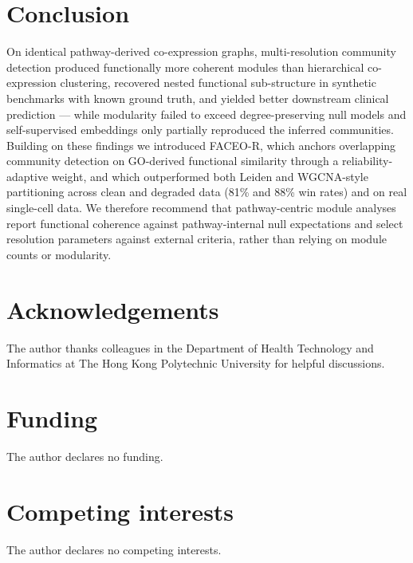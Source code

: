 \documentclass[twocolumn,10pt,a4paper]{article}
\begin{document}
\section{Conclusion}

On identical pathway-derived co-expression graphs, multi-resolution community detection
produced functionally more coherent modules than hierarchical co-expression clustering,
recovered nested functional sub-structure in synthetic benchmarks with known ground truth,
and yielded better downstream clinical prediction --- while modularity failed to exceed
degree-preserving null models and self-supervised embeddings only partially reproduced the
inferred communities. Building on these findings we introduced FACEO-R, which anchors
overlapping community detection on GO-derived functional similarity through a
reliability-adaptive weight, and which outperformed both Leiden and WGCNA-style
partitioning across clean and degraded data (81\% and 88\% win rates) and on real
single-cell data. We therefore recommend that pathway-centric module analyses report
functional coherence against pathway-internal null expectations and select resolution
parameters against external criteria, rather than relying on module counts or modularity.

\section*{Acknowledgements}

The author thanks colleagues in the Department of Health Technology and Informatics at The
Hong Kong Polytechnic University for helpful discussions.

\section*{Funding}

The author declares no funding.

\section*{Competing interests}

The author declares no competing interests.
\end{document}
